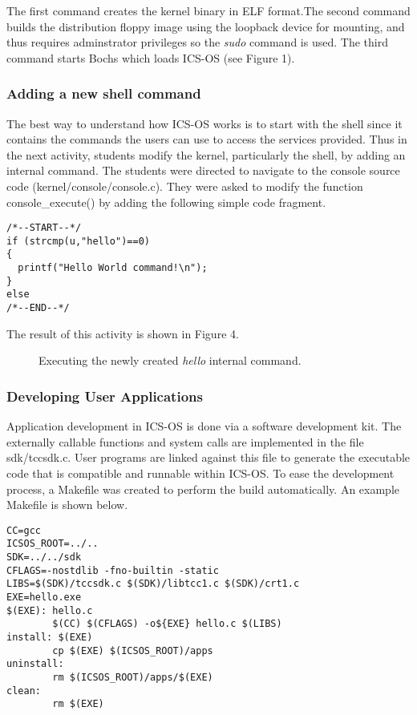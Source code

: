 \documentclass{acm_proc_article-sp}
\begin{document}
The first command creates the kernel binary in ELF format.The second command 
builds the distribution floppy image using the loopback device for mounting,
and thus requires adminstrator privileges so the \textit{sudo} command is used.
The third command starts Bochs\cite{bochs:site} which loads ICS-OS (see 
Figure 1).

\subsubsection{Adding a new shell command}
The best way to understand how ICS-OS works is to start with the shell since 
it contains the commands the users can use to access the services provided.
Thus in the next activity,  students modify the kernel,
particularly the shell, by adding an internal command. The students were
directed to navigate to the console source code (kernel/console/console.c). 
They were asked to modify the function console\_execute() by adding the 
following simple code fragment.

\begin{verbatim}
/*--START--*/
if (strcmp(u,"hello")==0)
{
  printf("Hello World command!\n");
}
else
/*--END--*/
\end{verbatim}

The result of this activity is shown in Figure 4.

\begin{figure}
\centering
{}
\caption{Executing the newly created \textit{hello} internal command.}
\end{figure}


\subsubsection{Developing User Applications}
Application development in ICS-OS is done via a software development kit.
The externally callable functions and system calls are implemented in the file 
sdk/tccsdk.c. User programs are linked against this file to generate the
executable code that is compatible and runnable within ICS-OS. To ease the 
development process, a Makefile was created to perform the build
automatically. An example Makefile is shown below.

\begin{verbatim}
CC=gcc
ICSOS_ROOT=../..
SDK=../../sdk
CFLAGS=-nostdlib -fno-builtin -static
LIBS=$(SDK)/tccsdk.c $(SDK)/libtcc1.c $(SDK)/crt1.c
EXE=hello.exe
$(EXE): hello.c
        $(CC) $(CFLAGS) -o${EXE} hello.c $(LIBS)
install: $(EXE)
        cp $(EXE) $(ICSOS_ROOT)/apps
uninstall:
        rm $(ICSOS_ROOT)/apps/$(EXE)
clean:
        rm $(EXE)
\end{verbatim}
\end{document}
